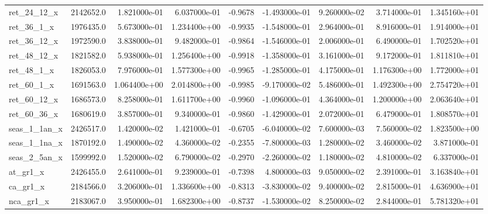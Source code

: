 \documentclass[10pt]{article}
\begin{document}
\begin{landscape}
\begin{longtable}{|l|r|r|r|r|r|r|r|r|}
ret\_24\_12\_x             &  2142652.0 &  1.821000e-01 &  6.037000e-01 &     -0.9678 & -1.493000e-01 &  9.260000e-02 &  3.714000e-01 &  1.345160e+01 \\
ret\_36\_1\_x              &  1976435.0 &  5.673000e-01 &  1.234400e+00 &     -0.9935 & -1.548000e-01 &  2.964000e-01 &  8.916000e-01 &  1.914000e+01 \\
ret\_36\_12\_x             &  1972590.0 &  3.838000e-01 &  9.482000e-01 &     -0.9864 & -1.546000e-01 &  2.006000e-01 &  6.490000e-01 &  1.702520e+01 \\
ret\_48\_12\_x             &  1821582.0 &  5.938000e-01 &  1.256400e+00 &     -0.9918 & -1.358000e-01 &  3.161000e-01 &  9.172000e-01 &  1.811810e+01 \\
ret\_48\_1\_x              &  1826053.0 &  7.976000e-01 &  1.577300e+00 &     -0.9965 & -1.285000e-01 &  4.175000e-01 &  1.176300e+00 &  1.772000e+01 \\
ret\_60\_1\_x              &  1691563.0 &  1.064400e+00 &  2.014800e+00 &     -0.9985 & -9.170000e-02 &  5.486000e-01 &  1.492300e+00 &  2.754720e+01 \\
ret\_60\_12\_x             &  1686573.0 &  8.258000e-01 &  1.611700e+00 &     -0.9960 & -1.096000e-01 &  4.364000e-01 &  1.200000e+00 &  2.063640e+01 \\
ret\_60\_36\_x             &  1680619.0 &  3.857000e-01 &  9.340000e-01 &     -0.9860 & -1.429000e-01 &  2.072000e-01 &  6.479000e-01 &  1.808570e+01 \\
seas\_1\_1an\_x            &  2426517.0 &  1.420000e-02 &  1.421000e-01 &     -0.6705 & -6.040000e-02 &  7.600000e-03 &  7.560000e-02 &  1.823500e+00 \\
seas\_1\_1na\_x            &  1870192.0 &  1.490000e-02 &  4.360000e-02 &     -0.2355 & -7.800000e-03 &  1.280000e-02 &  3.460000e-02 &  3.871000e-01 \\
seas\_2\_5an\_x            &  1599992.0 &  1.520000e-02 &  6.790000e-02 &     -0.2970 & -2.260000e-02 &  1.180000e-02 &  4.810000e-02 &  6.337000e-01 \\
at\_gr1\_x                &  2426455.0 &  2.641000e-01 &  9.239000e-01 &     -0.7398 &  4.800000e-03 &  9.050000e-02 &  2.391000e-01 &  3.163840e+01 \\
ca\_gr1\_x                &  2184566.0 &  3.206000e-01 &  1.336600e+00 &     -0.8313 & -3.830000e-02 &  9.400000e-02 &  2.815000e-01 &  4.636900e+01 \\
nca\_gr1\_x               &  2183067.0 &  3.950000e-01 &  1.682300e+00 &     -0.8737 & -1.530000e-02 &  8.250000e-02 &  2.844000e-01 &  5.781320e+01 \\

\end{longtable}
\end{landscape}
\end{document}

